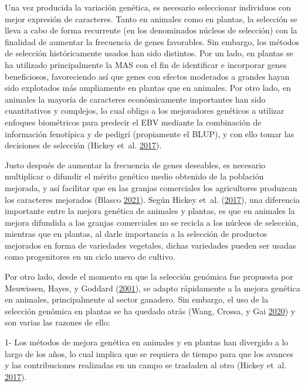 \documentclass[11pt,spanish,a4paper,oneside,]{book} %
\begin{document}
Una vez producida la variación genética, es necesario seleccionar individuos con mejor expresión de caracteres. Tanto en animales como en plantas, la selección se lleva a cabo de forma recurrente (en los denominados núcleos de selección) con la finalidad de aumentar la frecuencia de genes favorables. Sin embargo, los métodos de selección históricamente usados han sido distintos. Por un lado, en plantas se ha utilizado principalmente la MAS con el fin de identificar e incorporar genes beneficiosos, favoreciendo así que genes con efectos moderados a grandes hayan sido explotados más ampliamente en plantas que en animales. Por otro lado, en animales la mayoría de caracteres económicamente importantes han sido cuantitativos y complejos, lo cual obligo a los mejoradores genéticos a utilizar enfoques biométricos para predecir el EBV mediante la combinación de información fenotípica y de pedigrí (propiamente el BLUP), y con ello tomar las decisiones de selección (Hickey et~al. \protect\hyperlink{ref-cite:44}{2017}).

Justo después de aumentar la frecuencia de genes deseables, es necesario multiplicar o difundir el mérito genético medio obtenido de la población mejorada, y así facilitar que en las granjas comerciales los agricultores produzcan los caracteres mejorados (Blasco \protect\hyperlink{ref-cite:21}{2021}). Según Hickey et~al. (\protect\hyperlink{ref-cite:44}{2017}), una diferencia importante entre la mejora genética de animales y plantas, es que en animales la mejora difundida a las granjas comerciales no se recicla a los núcleos de selección, mientras que en plantas, al darle importancia a la selección de productos mejorados en forma de variedades vegetales, dichas variedades pueden ser usadas como progenitores en un ciclo nuevo de cultivo.

Por otro lado, desde el momento en que la selección genómica fue propuesta por Meuwissen, Hayes, y Goddard (\protect\hyperlink{ref-cite:8}{2001}), se adapto rápidamente a la mejora genética en animales, principalmente al sector ganadero. Sin embargo, el uso de la selección genómica en plantas se ha quedado atrás (Wang, Crossa, y Gai \protect\hyperlink{ref-cite:46}{2020}) y son varias las razones de ello:

1- Los métodos de mejora genética en animales y en plantas han divergido a lo largo de los años, lo cual implica que se requiera de tiempo para que los avances y las contribuciones realizadas en un campo se trasladen al otro (Hickey et~al. \protect\hyperlink{ref-cite:44}{2017}).
\end{document}

